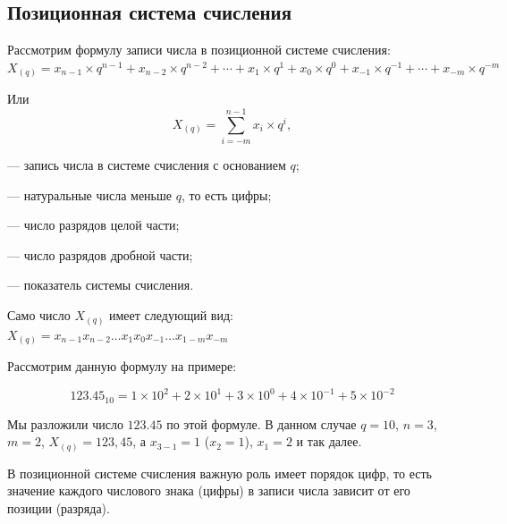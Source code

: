 \subsection{Позиционная система счисления}\label{subsec:positional-systems}

Рассмотрим формулу записи числа в позиционной системе счисления: $X_{(q)} = x_{n-1} \times q^{n-1} + x_{n-2} \times q^{n-2} + \cdots + \allowbreak x_{1} \times q^{1} + x_{0}\times q^{0} + x_{-1} \times q^{-1} \allowbreak + \cdots + \allowbreak x_{-m} \times q^{-m}$

Или
\[
    X_{(q)} = \sum_{i=-m}^{n-1} x_{i} \times q^{i},
\]

\begin{where}
    \item [$X_{(q)}$] --- запись числа в системе счисления с основанием $q$;
    \item [$x_{i}$] --- натуральные числа меньше $q$, то есть цифры;
    \item [$n$] --- число разрядов целой части;
    \item [$m$] --- число разрядов дробной части;
    \item [$q$] --- показатель системы счисления.
\end{where}

\bigskip\noindent
Само число $X_{(q)}$ имеет следующий вид: $\displaystyle X_{(q)} = x_{n-1} x_{n-2} \dots x_{1} x_{0} x_{-1} \dots x_{1-m} x_{-m}$

\noindent
Рассмотрим данную формулу на примере:

\[
    \num{123.45}_{10} = 1\times 10^{2} + 2\times 10^{1} + 3\times 10^{0} + 4\times 10^{-1} + 5\times 10^{-2}
\]

\noindent
Мы разложили число $\num{123.45}$ по этой формуле. В данном случае $q = 10$, $n = 3$, $m = 2$, $X_{(q)} = 123,45$, а $x_{3-1} = 1$ ($x_{2} = 1$), $x_{1} = 2$ и так далее.

В позиционной системе счисления важную роль имеет порядок цифр, то есть значение каждого числового знака (цифры) в записи числа зависит от его позиции (разряда).
